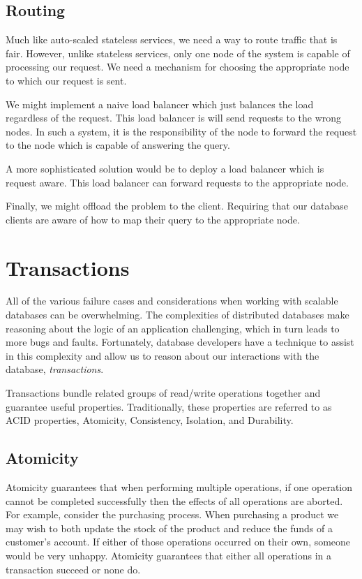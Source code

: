 \subsection{Routing}

Much like auto-scaled stateless services,
we need a way to route traffic that is fair.
However, unlike stateless services,
only one node of the system is capable of processing our request.
We need a mechanism for choosing the appropriate node to which our request is sent.

We might implement a naive load balancer which just balances the load regardless of the request.
This load balancer is will send requests to the wrong nodes.
In such a system, it is the responsibility of the node to forward the request to the node which is capable of answering the query.

A more sophisticated solution would be to deploy a load balancer which is request aware.
This load balancer can forward requests to the appropriate node.

Finally, we might offload the problem to the client.
Requiring that our database clients are aware of how to map their query to the appropriate node.

\section{Transactions}

All of the various failure cases and considerations when working with scalable databases can be overwhelming.
The complexities of distributed databases make reasoning about the logic of an application challenging,
which in turn leads to more bugs and faults.
Fortunately, database developers have a technique to assist in this complexity and allow us to reason about our interactions with the database, \textsl{transactions}.

Transactions bundle related groups of read/write operations together and guarantee useful properties.
Traditionally, these properties are referred to as ACID properties, Atomicity, Consistency, Isolation, and Durability.

\subsection{Atomicity}
Atomicity guarantees that when performing multiple operations,
if one operation cannot be completed successfully then the effects of all operations are aborted.
For example, consider the purchasing process.
When purchasing a product we may wish to both update the stock of the product and reduce the funds of a customer's account.
If either of those operations occurred on their own,
someone would be very unhappy.
Atomicity guarantees that either all operations in a transaction succeed or none do.

